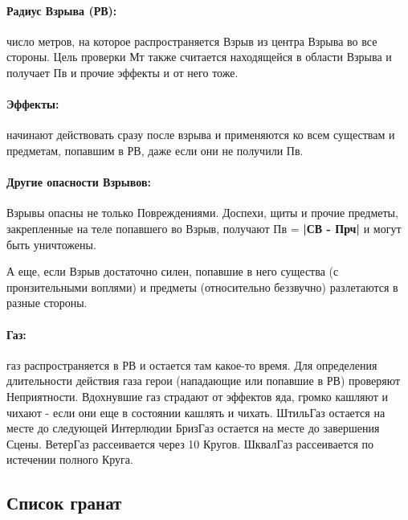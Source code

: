 \paragraph{Радиус Взрыва (РВ):} число метров, на которое распространяется Взрыв из центра Взрыва во все стороны. Цель проверки Мт также считается находящейся в области Взрыва и получает Пв и прочие эффекты и от него тоже.
\paragraph{Эффекты:} начинают действовать сразу после взрыва и применяются ко всем существам и предметам, попавшим в РВ, даже если они не получили Пв. 
\paragraph{Другие опасности Взрывов:} Взрывы опасны не только Повреждениями. Доспехи, щиты и прочие предметы, закрепленные на теле попавшего во Взрыв, получают Пв = \textbf{|СВ - Прч|} и могут быть уничтожены. 
\begin{tcolorbox}
    А еще, если Взрыв достаточно силен, попавшие в него существа (с пронзительными воплями) и предметы (относительно беззвучно) разлетаются в разные стороны. 
\end{tcolorbox}

\paragraph{Газ:} газ распространяется в РВ и остается там какое-то время. Для определения длительности действия газа герои (нападающие или попавшие в РВ) проверяют Неприятности. Вдохнувшие газ страдают от эффектов яда, громко кашляют и чихают - если они еще в состоянии кашлять и чихать. 
\trouble
{Штиль}{Газ остается на месте до следующей Интерлюдии}
{Бриз}{Газ остается на месте до завершения Сцены.}
{Ветер}{Газ рассеивается через 10 Кругов.}
{Шквал}{Газ рассеивается по истечении полного Круга.}
\tbd

\subsection{Список гранат}

